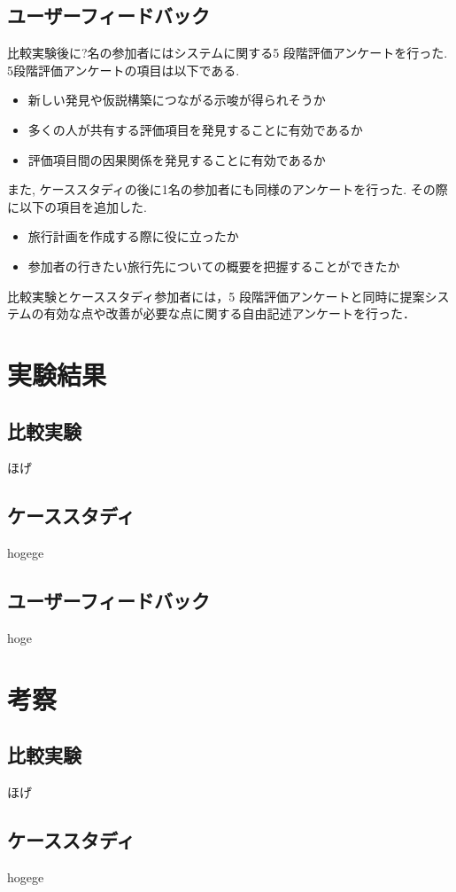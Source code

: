 \documentclass[syuuron]{kuee}
\begin{document}
	\section{ユーザーフィードバック}
		比較実験後に?名の参加者にはシステムに関する5 段階評価アンケートを行った. 
		5段階評価アンケートの項目は以下である. 
		\begin{itemize}
			\item 新しい発見や仮説構築につながる示唆が得られそうか
			\item 多くの人が共有する評価項目を発見することに有効であるか
			\item 評価項目間の因果関係を発見することに有効であるか
		\end{itemize}
		また, ケーススタディの後に1名の参加者にも同様のアンケートを行った. 
		その際に以下の項目を追加した. 
		\begin{itemize}
			\item 旅行計画を作成する際に役に立ったか
			\item 参加者の行きたい旅行先についての概要を把握することができたか
		\end{itemize}
		比較実験とケーススタディ参加者には，5 段階評価アンケートと同時に提案システムの有効な点や改善が必要な点に関する自由記述アンケートを行った．

\chapter{実験結果}
	\section{比較実験}
	ほげ
	\section{ケーススタディ}
	hogege
	\section{ユーザーフィードバック}
	hoge
			
\chapter{考察}
	\section{比較実験}
	ほげ
	\section{ケーススタディ}%
	hogege
\end{document}
